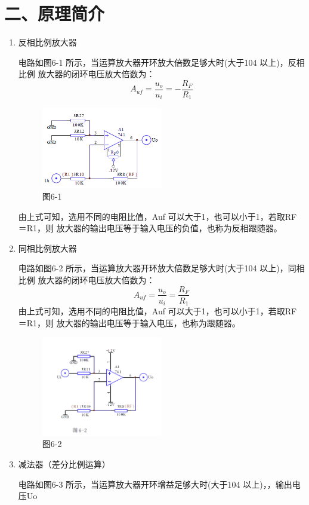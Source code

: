 \documentclass[a4paper,10pt,notitlepage]{article}
\begin{document}
	\section*{二、原理简介}
	\begin{enumerate}
		\item 反相比例放大器\par 
		\qquad 电路如图6-1 所示，当运算放大器开环放大倍数足够大时(大于104 以上)，反相比例
		放大器的闭环电压放大倍数为：$$A_{uf}=\frac{u_o}{u_i}=-\frac{R_F}{R_1}$$
		\begin{figure}[h]
			\centering
			\includegraphics[width=0.5\textwidth]{2.png}
			\caption*{图6-1 }
		\end{figure}
		\qquad 由上式可知，选用不同的电阻比值，Auf 可以大于1，也可以小于1，若取RF＝R1，则
		放大器的输出电压等于输入电压的负值，也称为反相跟随器。
		\item 同相比例放大器\par 
		\qquad 电路如图6-2 所示，当运算放大器开环放大倍数足够大时(大于104 以上)，同相比例
		放大器的闭环电压放大倍数为：$$A_{uf}=\frac{u_o}{u_i}=\frac{R_F}{R_1}$$
		\qquad 由上式可知，选用不同的电阻比值，Auf 可以大于1，也可以小于1，若取RF＝R1，则
		放大器的输出电压等于输入电压，也称为跟随器。
		\begin{figure}[h]
			\centering
			\includegraphics[width=0.5\textwidth]{3.png}
			\caption*{图6-2 }
		\end{figure}
		\item 减法器（差分比例运算）\par 
		\qquad 电路如图6-3 所示，当运算放大器开环增益足够大时(大于104 以上)，，输出电压Uo

\end{enumerate}
\end{document}
